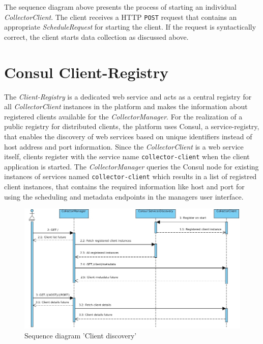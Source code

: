 The sequence diagram above presents the process of starting an individual \textit{CollectorClient}. The client receives a HTTP
\verb|POST| request that contains an appropriate \textit{ScheduleRequest} for starting the client. If the request is syntactically
correct, the client starts data collection as discussed above.

\section{Consul Client-Registry}

The \textit{Client-Registry} is a dedicated web service and acts as a central registry for all \textit{CollectorClient} instances
in the platform and makes the information about registered clients available for the \textit{CollectorManager}.
For the realization of a public registry for distributed clients, the platform uses Consul, a service-registry, that enables the discovery
of web services based on unique identifiers instead of host address and port information. Since the \textit{CollectorClient} is a web service itself,
clients register with the service name \verb|collector-client| when the client application is started. The \textit{CollectorManager}
queries the Consul node for existing instances of services named \verb|collector-client| which results in a list of registred client instances,
that contains the required information like host and port for using the scheduling and metadata endpoints in the managers user interface.

\begin{figure}[H]
	\centering
	\includegraphics[width=1.0\textwidth]{../uml/sequence-discovery.jpg}
	\caption{Sequence diagram 'Client discovery'}
	\label{fig:sequence-client-discovery}
\end{figure}

